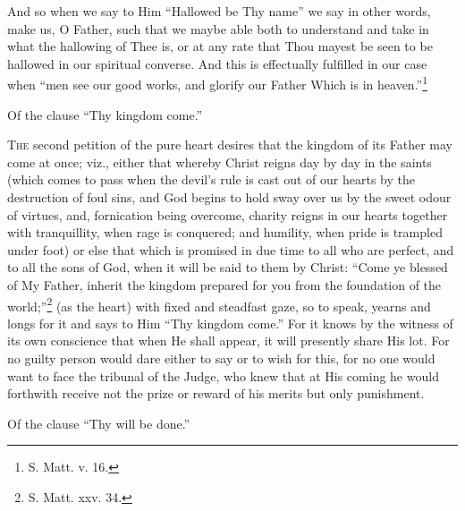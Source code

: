 And so when we say to Him “Hallowed be Thy name” we say in other words, make us, O Father, such that we maybe able both to understand and take in what the hallowing of Thee is, or at any rate that Thou mayest be seen to be hallowed in our spiritual converse. And this is effectually fulfilled in our case when “men see our good works, and glorify our Father Which is in heaven.”\footnote{S. Matt. v. 16.}


Of the clause “Thy kingdom come.”

\textsc{The} second petition of the pure heart desires that the kingdom of its Father may come at once; viz., either that whereby Christ reigns day by day in the saints (which comes to pass when the devil’s rule is cast out of our hearts by the destruction of foul sins, and God begins to hold sway over us by the sweet odour of virtues, and, fornication being overcome, charity reigns in our hearts together with tranquillity, when rage is conquered; and humility, when pride is trampled under foot) or else that which is promised in due time to all who are perfect, and to all the sons of God, when it will be said to them by Christ: “Come ye blessed of My Father, inherit the kingdom prepared for you from the foundation of the world;”\footnote{S. Matt. xxv. 34.} (as the heart) with fixed and steadfast gaze, so to speak, yearns and longs for it and says to Him “Thy kingdom come.” For it knows by the witness of its own conscience that when He shall appear, it will presently share His lot. For no guilty person would dare either to say or to wish for this, for no one would want to face the tribunal of the Judge, who knew that at His coming he would forthwith receive not the prize or reward of his merits but only punishment.


Of the clause “Thy will be done.”

